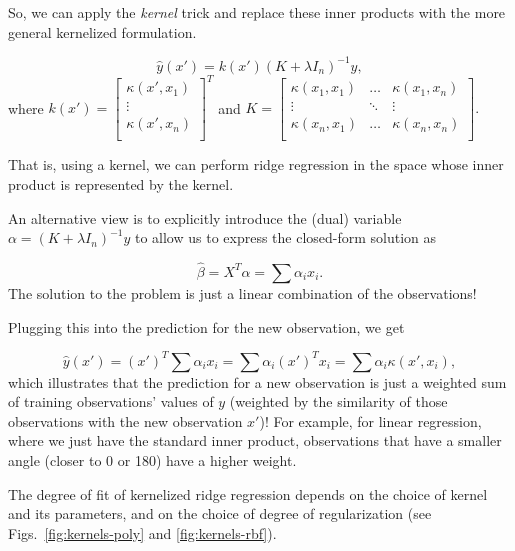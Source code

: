 \begin{refsection}
So, we can apply the \emph{kernel} trick and replace these inner products with the more general kernelized formulation.

$$\hat{y}(x') = k(x')(K + \lambda I_n)^{-1}y,$$
%
where $k(x') = \begin{bmatrix} 
\kappa(x',x_1) \\
 \vdots \\ 
\kappa(x',x_n) \\  \end{bmatrix}^T $ and $K = \begin{bmatrix} 
\kappa(x_1,x_1) & \hdots & \kappa(x_1,x_n) \\
 \vdots & \ddots & \vdots \\ 
 \kappa(x_n,x_1) & \hdots & \kappa(x_n,x_n) \\  \end{bmatrix}. $
 
That is, using a kernel, we can perform ridge regression in the space whose inner product is represented by the kernel.

An alternative view is to explicitly introduce the (dual) variable $\alpha = (K + \lambda I_n)^{-1}y$ to allow us to express the closed-form solution as

$$\hat{\beta} = X^T\alpha = \sum \alpha_i x_i.$$
%
The solution to the problem is just a linear combination of the observations!

Plugging this into the prediction for the new observation, we get

$$\hat{y}(x') = (x')^T \sum \alpha_i x_i  =  \sum \alpha_i (x')^T x_i = \sum \alpha_i \kappa(x',x_i),$$
%
which illustrates that the prediction for a new observation is just a weighted sum of training observations' values of $y$ (weighted by the similarity of those observations with the new observation $x'$)! For example, for linear regression, where we just have the standard inner product, observations that have a smaller angle (closer to 0 or 180) have a higher weight.

The degree of fit of kernelized ridge regression depends on the choice of kernel and its parameters, and on the choice of degree of regularization (see Figs.~\ref{fig:kernels-poly} and \ref{fig:kernels-rbf}).


\end{refsection}
